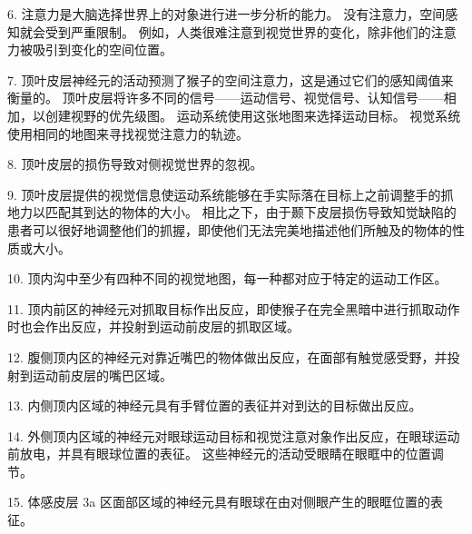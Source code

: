 6. 注意力是大脑选择世界上的对象进行进一步分析的能力。 没有注意力，空间感知就会受到严重限制。 例如，人类很难注意到视觉世界的变化，除非他们的注意力被吸引到变化的空间位置。 

7. 顶叶皮层神经元的活动预测了猴子的空间注意力，这是通过它们的感知阈值来衡量的。 顶叶皮层将许多不同的信号——运动信号、视觉信号、认知信号——相加，以创建视野的优先级图。 运动系统使用这张地图来选择运动目标。 视觉系统使用相同的地图来寻找视觉注意力的轨迹。 

8. 顶叶皮层的损伤导致对侧视觉世界的忽视。 

9. 顶叶皮层提供的视觉信息使运动系统能够在手实际落在目标上之前调整手的抓地力以匹配其到达的物体的大小。 相比之下，由于颞下皮层损伤导致知觉缺陷的患者可以很好地调整他们的抓握，即使他们无法完美地描述他们所触及的物体的性质或大小。 

10. 顶内沟中至少有四种不同的视觉地图，每一种都对应于特定的运动工作区。 

11. 顶内前区的神经元对抓取目标作出反应，即使猴子在完全黑暗中进行抓取动作时也会作出反应，并投射到运动前皮层的抓取区域。 

12. 腹侧顶内区的神经元对靠近嘴巴的物体做出反应，在面部有触觉感受野，并投射到运动前皮层的嘴巴区域。 

13. 内侧顶内区域的神经元具有手臂位置的表征并对到达的目标做出反应。 

14. 外侧顶内区域的神经元对眼球运动目标和视觉注意对象作出反应，在眼球运动前放电，并具有眼球位置的表征。 这些神经元的活动受眼睛在眼眶中的位置调节。 

15. 体感皮层 3a 区面部区域的神经元具有眼球在由对侧眼产生的眼眶位置的表征。

